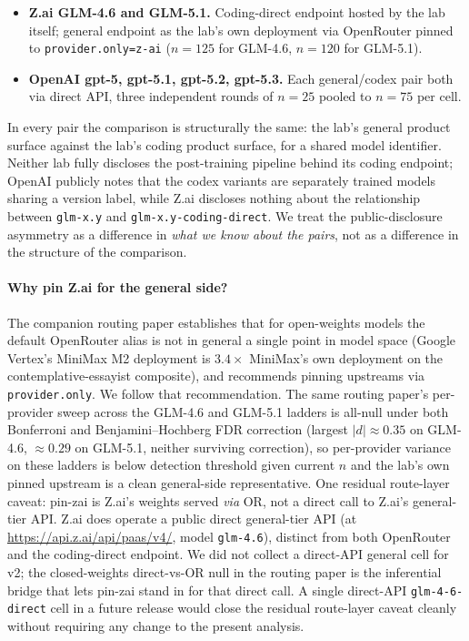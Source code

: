 \documentclass[11pt,a4paper]{article}
\begin{document}
\begin{itemize}[leftmargin=2em, itemsep=0.2em, topsep=0.3em]
\item \textbf{Z.ai GLM-4.6 and GLM-5.1.} Coding-direct endpoint hosted by the lab itself; general endpoint as the lab's own deployment via OpenRouter pinned to \texttt{provider.only=z-ai} ($n{=}125$ for GLM-4.6, $n{=}120$ for GLM-5.1).
\item \textbf{OpenAI gpt-5, gpt-5.1, gpt-5.2, gpt-5.3.} Each general/codex pair both via direct API, three independent rounds of $n{=}25$ pooled to $n{=}75$ per cell.
\end{itemize}

In every pair the comparison is structurally the same: the lab's general product surface against the lab's coding product surface, for a shared model identifier. Neither lab fully discloses the post-training pipeline behind its coding endpoint; OpenAI publicly notes that the codex variants are separately trained models sharing a version label, while Z.ai discloses nothing about the relationship between \texttt{glm-x.y} and \texttt{glm-x.y-coding-direct}. We treat the public-disclosure asymmetry as a difference in \emph{what we know about the pairs}, not as a difference in the structure of the comparison.

\paragraph{Why pin Z.ai for the general side?} The companion routing paper \citep{tenner2026routing} establishes that for open-weights models the default OpenRouter alias is not in general a single point in model space (Google Vertex's MiniMax M2 deployment is $3.4\times$ MiniMax's own deployment on the contemplative-essayist composite), and recommends pinning upstreams via \texttt{provider.only}. We follow that recommendation. The same routing paper's per-provider sweep across the GLM-4.6 and GLM-5.1 ladders is all-null under both Bonferroni and Benjamini--Hochberg FDR correction (largest $|d|\approx 0.35$ on GLM-4.6, $\approx 0.29$ on GLM-5.1, neither surviving correction), so per-provider variance on these ladders is below detection threshold given current $n$ and the lab's own pinned upstream is a clean general-side representative. One residual route-layer caveat: pin-zai is Z.ai's weights served \emph{via} OR, not a direct call to Z.ai's general-tier API. Z.ai does operate a public direct general-tier API (at \url{https://api.z.ai/api/paas/v4/}, model \texttt{glm-4.6}), distinct from both OpenRouter and the coding-direct endpoint. We did not collect a direct-API general cell for v2; the closed-weights direct-vs-OR null in the routing paper is the inferential bridge that lets pin-zai stand in for that direct call. A single direct-API \texttt{glm-4-6-direct} cell in a future release would close the residual route-layer caveat cleanly without requiring any change to the present analysis.
\end{document}
